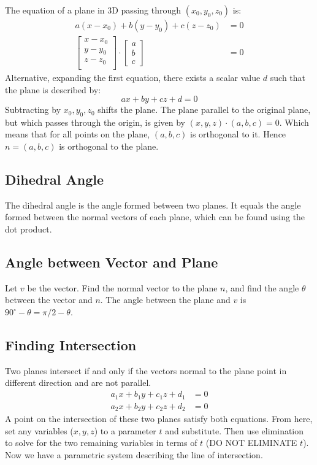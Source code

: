 \documentclass{article}
\begin{document}
The equation of a plane in 3D passing through $(x_0,y_0,z_0)$ is:
\begin{align*}
	a(x-x_0)+b(y-y_0)+c(z-z_0)&=0 \\
	\begin{bmatrix}
		x-x_0 \\
		y-y_0 \\
		z-z_0 \\
	\end{bmatrix}
	\cdot \begin{bmatrix}
		a \\ b \\ c
	\end{bmatrix}
	&=0
\end{align*}
Alternative, expanding the first equation, there exists a scalar value $d$ such that the plane is described by:
\begin{equation*}
	ax+by+cz+d=0
\end{equation*}
Subtracting by $x_0,y_0,z_0$ shifts the plane. The plane parallel to the original plane, but which passes through the origin, is given by $(x,y,z)\cdot(a,b,c)=0$. Which means that for all points on the plane, $(a,b,c)$ is orthogonal to it. Hence $n=(a,b,c)$ is orthogonal to the plane.

\subsection{Dihedral Angle}

The dihedral angle is the angle formed between two planes. It equals the angle formed between the normal vectors of each plane, which can be found using the dot product.

\subsection{Angle between Vector and Plane}

Let $v$ be the vector. Find the normal vector to the plane $n$, and find the angle $\theta$ between the vector and $n$. The angle between the plane and $v$ is $90^\circ-\theta=\pi/2-\theta$.

\subsection{Finding Intersection}

Two planes intersect if and only if the vectors normal to the plane point in different direction and are not parallel.
\begin{align*}
    a_1x+b_1y+c_1z+d_1&=0 \\
    a_2x+b_2y+c_2z+d_2&=0
\end{align*}
A point on the intersection of these two planes satisfy both equations. From here, set any variables ($x,y,z$) to a parameter $t$ and substitute. Then use elimination to solve for the two remaining variables in terms of $t$ (DO NOT ELIMINATE $t$). Now we have a parametric system describing the line of intersection.
\end{document}
